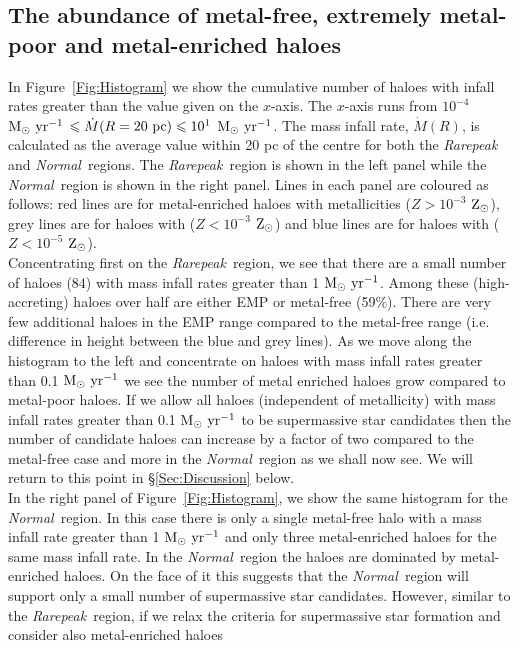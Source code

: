 \documentclass[graphics, twocolumn, usenatbib]{mn2e}
\newcommand{\msolaryr} {$\rm{M_{\odot}~yr^{-1}}~$}
\newcommand{\msolaryrc} {$\rm{M_{\odot}~yr^{-1}}$}
\newcommand{\zsolarc} {$\rm{Z_{\odot}}$}
\newcommand{\rarepeak} {\textit{Rarepeak~}}
\newcommand{\normal} {\textit{Normal~}}
\begin{document}
\subsection{The abundance of metal-free, extremely metal-poor and metal-enriched haloes}

In Figure~\ref{Fig:Histogram} we show the cumulative number of haloes with infall rates greater than
the value given on the $x$-axis. The $x$-axis runs from
$10^{-4}$ \msolaryr $\leq \dot{M}(R=20~{\rm pc}) \leq 10^{1}$ \msolaryrc. 
 The mass infall rate,
$\dot{M}(R)$, is calculated as the average value within 20 pc of the centre for both the \rarepeak 
and \normal regions. The
\rarepeak region is shown in the left panel while the \normal region is shown in the right 
panel. Lines in each panel are coloured as follows: red lines are for metal-enriched haloes with
metallicities ($Z > 10^{-3}$ \zsolarc), grey lines are for haloes with ($Z < 10^{-3}$ \zsolarc) and
blue lines are for haloes with ($Z < 10^{-5}$ \zsolarc).\\
\indent Concentrating first on the \rarepeak region, we see that there are a small number of
haloes ($84$) with mass infall rates greater than 1 \msolaryrc. Among these (high-accreting)
haloes over half are either EMP or metal-free (59\%).  There are very few additional haloes in the
EMP range compared to the metal-free range (i.e. difference in height between the
blue and grey lines). As we move along the histogram to the
left and concentrate on haloes with mass infall rates greater than 0.1 \msolaryr we see the
number of metal enriched haloes grow compared to
metal-poor haloes. If we allow all haloes (independent of metallicity) with mass infall rates greater
than  0.1 \msolaryr to be supermassive star candidates then the number of candidate haloes can
increase by a factor of two compared to the metal-free case and more in the \normal region as we
shall now see. We will return to this point in \S \ref{Sec:Discussion} below. \\
\indent In the right panel of Figure~\ref{Fig:Histogram},
we show the same histogram for the \normal region. In this case there is only a single metal-free halo
with a mass infall rate greater than 1 \msolaryr and only three metal-enriched haloes for the
same mass infall rate. In the \normal region the haloes are dominated by metal-enriched haloes.
On the face of it this suggests that the \normal region will
support only a small number of supermassive star candidates. However, similar to the \rarepeak region,
if we relax the criteria for supermassive star formation and consider also metal-enriched haloes
\end{document}
